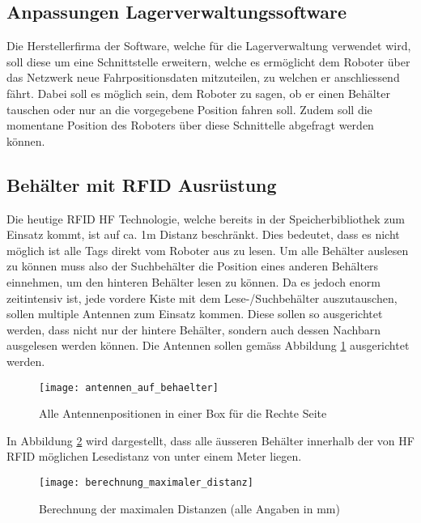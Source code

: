 \subsection{Anpassungen Lagerverwaltungssoftware}
\label{sec:roboterSWAnpassung}
Die Herstellerfirma der Software, welche für die Lagerverwaltung verwendet wird, soll diese um eine Schnittstelle erweitern, welche es ermöglicht dem Roboter über das Netzwerk neue Fahrpositionsdaten mitzuteilen, zu welchen er anschliessend fährt. Dabei soll es möglich sein, dem Roboter zu sagen, ob er einen Behälter tauschen oder nur an die vorgegebene Position fahren soll. Zudem soll die momentane Position des Roboters über diese Schnittelle abgefragt werden können. 

\subsection{Behälter mit RFID Ausrüstung}
\label{sec:behaelterMitRFID}
Die heutige RFID HF Technologie, welche bereits in der Speicherbibliothek zum Einsatz kommt, ist auf ca. 1m Distanz beschränkt. Dies bedeutet, dass es nicht möglich ist alle Tags direkt vom Roboter aus zu lesen. Um alle Behälter auslesen zu können muss also der Suchbehälter die Position eines anderen Behälters einnehmen, um den hinteren Behälter lesen zu können. Da es jedoch enorm zeitintensiv ist, jede vordere Kiste mit dem Lese-/Suchbehälter auszutauschen, sollen multiple Antennen zum Einsatz kommen. Diese sollen so ausgerichtet werden, dass nicht nur der hintere Behälter, sondern auch dessen Nachbarn ausgelesen werden können.
Die Antennen sollen gemäss Abbildung \ref{fig:antennenPositionen} ausgerichtet werden.

\begin{figure}[htb]
	\centering
	\texttt{[image: antennen\_auf\_behaelter]}
	\caption{Alle Antennenpositionen in einer Box für die Rechte Seite}
	\label{fig:antennenPositionen}
\end{figure}

In Abbildung \ref{fig:distanzcalc} wird dargestellt, dass alle äusseren Behälter innerhalb der von HF RFID möglichen Lesedistanz von unter einem Meter liegen.

\begin{figure}[htb]
	\centering
	\texttt{[image: berechnung\_maximaler\_distanz]}
	\caption{Berechnung der maximalen Distanzen (alle Angaben in mm)}
	\label{fig:distanzcalc}
\end{figure}


